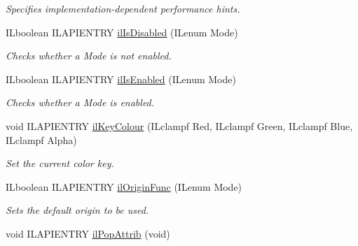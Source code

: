 \begin{DoxyCompactItemize}
\begin{DoxyCompactList}\small\item\em Specifies implementation-\/dependent performance hints. \end{DoxyCompactList}\item 
I\-Lboolean I\-L\-A\-P\-I\-E\-N\-T\-R\-Y \hyperlink{group__state_ga6fdd0b1ac89f9a43bdb3be9a23cbe354}{il\-Is\-Disabled} (I\-Lenum Mode)
\begin{DoxyCompactList}\small\item\em Checks whether a {\itshape Mode} is not enabled. \end{DoxyCompactList}\item 
I\-Lboolean I\-L\-A\-P\-I\-E\-N\-T\-R\-Y \hyperlink{group__state_ga8f2fb1299fd1cf25c2a959aa3837cc48}{il\-Is\-Enabled} (I\-Lenum Mode)
\begin{DoxyCompactList}\small\item\em Checks whether a {\itshape Mode} is enabled. \end{DoxyCompactList}\item 
\hypertarget{group__state_gaf3c1ed8cef65fe9816a3c00486d94fd2}{void I\-L\-A\-P\-I\-E\-N\-T\-R\-Y \hyperlink{group__state_gaf3c1ed8cef65fe9816a3c00486d94fd2}{il\-Key\-Colour} (I\-Lclampf Red, I\-Lclampf Green, I\-Lclampf Blue, I\-Lclampf Alpha)}\label{group__state_gaf3c1ed8cef65fe9816a3c00486d94fd2}

\begin{DoxyCompactList}\small\item\em Set the current color key. \end{DoxyCompactList}\item 
I\-Lboolean I\-L\-A\-P\-I\-E\-N\-T\-R\-Y \hyperlink{group__state_gab518656efaed3f7ca95857e367e62ccd}{il\-Origin\-Func} (I\-Lenum Mode)
\begin{DoxyCompactList}\small\item\em Sets the default origin to be used. \end{DoxyCompactList}\item 
\hypertarget{group__state_gacc9ee35a9e48b55880655f6d143f39c1}{void I\-L\-A\-P\-I\-E\-N\-T\-R\-Y \hyperlink{group__state_gacc9ee35a9e48b55880655f6d143f39c1}{il\-Pop\-Attrib} (void)}\label{group__state_gacc9ee35a9e48b55880655f6d143f39c1}


\end{DoxyCompactItemize}
